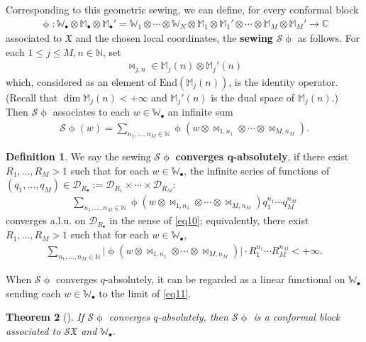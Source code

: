 \documentclass[12pt,a4paper,notitlepage]{article}
\theoremstyle{definition}
\newtheorem{df}{Definition}[subsection]
\theoremstyle{plain}
\newtheorem{thm}[df]{Theorem}
\newcommand{\fk}{\mathfrak}
\newcommand{\mc}{\mathcal}
\newcommand{\End}{\mathrm{End}} %
\newcommand{\scr}{\mathscr}
\newcommand{\bsb}{\boldsymbol}
\newcommand{\blt}{\bullet}
\newcommand{\Wbb}{\mathbb W}
\newcommand{\Mbb}{\mathbb M}
\newcommand{\Cbb}{\mathbb C}
\newcommand{\Nbb}{\mathbb N}
\numberwithin{equation}{subsection}
\begin{document}
Corresponding to this geometric sewing, we can define, for every conformal block
\begin{align*}
\upphi:\Wbb_\blt\otimes\Mbb_\blt\otimes\Mbb_\blt'=\Wbb_1\otimes\cdots\otimes \Wbb_N\otimes\Mbb_1\otimes\Mbb_1'\otimes\cdots\otimes\Mbb_M\otimes\Mbb_M'\rightarrow\Cbb	
\end{align*}
associated to $\fk X$ and the chosen local coordinates, the \textbf{sewing} $\scr S\upphi$ as follows. For each $1\leq j\leq M,n\in\Nbb$, set
\begin{align}
\bowtie_{j,n}\in\Mbb_j(n)\otimes\Mbb_j'(n)	
\end{align}
which, considered as an element of $\End(\Mbb_j(n))$, is the identity operator. (Recall that $\dim\Mbb_j(n)<+\infty$ and $\Mbb_j'(n)$ is the dual space of $\Mbb_j(n)$.) Then $\scr S\upphi$ associates to each $w\in\Wbb_\blt$ an infinite sum
\begin{align}
\scr S\upphi(w)=\sum_{n_1,\dots,n_M\in\Nbb}\upphi(w\otimes \bowtie_{1,n_1}\otimes\cdots\otimes\bowtie_{M,n_M}).	\label{eq11}
\end{align}
\begin{df}\label{lb18}
We say the sewing $\scr S\upphi$ \textbf{converges $\bsb q$-absolutely}, if there exist $R_1,\dots,R_M>1$ such that for each $w\in\Wbb_\blt$, the infinite series of functions of $(q_1,\dots,q_M)\in\mc D_{R_\blt}:=\mc D_{R_1}\times\cdots\times\mc D_{R_M}$:
\begin{align*}
\sum_{n_1,\dots,n_M\in\Nbb}\upphi(w\otimes \bowtie_{1,n_1}\otimes\cdots\otimes\bowtie_{M,n_M})q_1^{n_1}\cdots q_M^{n_M}	
\end{align*}
converges a.l.u. on $\mc D_{R_\blt}$ in the sense of \eqref{eq10}; equivalently, there exist $R_1,\dots,R_M>1$ such that for each $w\in\Wbb_\blt$,
\begin{align*}
\sum_{n_1,\dots,n_M\in\Nbb}\big|\upphi(w\otimes \bowtie_{1,n_1}\otimes\cdots\otimes\bowtie_{M,n_M})\big|\cdot R_1^{n_1}\cdots R_M^{n_M}<+\infty.
\end{align*}
\end{df}

When $\scr S\upphi$ converges $q$-absolutely, it can be regarded as a linear functional on $\Wbb_\blt$ sending each $w\in\Wbb_\blt$ to the limit of \eqref{eq11}.

\begin{thm}[{\cite[Thm. 11.3]{Gui20b}}]\label{lb37}
If $\scr S\upphi$ converges $q$-absolutely, then $\scr S\upphi$ is a conformal block associated to $\scr S\fk X$ and $\Wbb_\blt$.
\end{thm}
\end{document}
